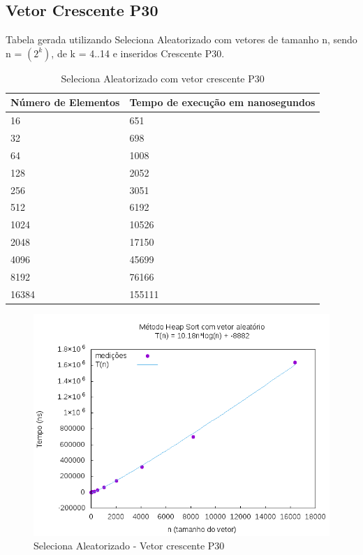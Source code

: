 \documentclass[12pt,a4paper,twoside]{report}
\begin{document}
\subsection{Vetor Crescente P30}
Tabela gerada utilizando Seleciona Aleatorizado com vetores de tamanho n, sendo n = $(2^k)$, de k = 4..14 e inseridos Crescente P30.
\begin{table}[H]
\centering
\caption{Seleciona Aleatorizado com vetor crescente P30}
\label{my-label}
\begin{tabular}{|l|l|}
\hline
\multicolumn{1}{|c|}{\textbf{Número de Elementos}} & \multicolumn{1}{c|}{\textbf{Tempo de execução em nanosegundos}} \\ \hline
16 & 651 \\ \hline
32 & 698 \\ \hline
64 & 1008 \\ \hline
128 & 2052 \\ \hline
256 & 3051 \\ \hline
512 & 6192 \\ \hline
1024 & 10526 \\ \hline
2048 & 17150 \\ \hline
4096 & 45699 \\ \hline
8192 & 76166 \\ \hline
16384 & 155111 \\ \hline
\end{tabular}
\end{table}

\begin{figure}[H]
    \centering
    \includegraphics[width=0.7\linewidth]{graficos/HeapSort/vIntAleatorio/vIntAleatorio.png}
  \caption{Seleciona Aleatorizado - Vetor crescente P30}
\end{figure}
\end{document}
